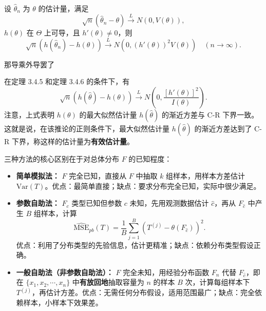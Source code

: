 \begin{theorem}[Delta 方法--也就是原来相当于y=x现在更普遍]
设 $\hat{\theta}_n$ 为 $\theta$ 的估计量，满足
$$
\sqrt{n}(\hat{\theta}_n - \theta) \xrightarrow{L} N(0, V(\theta)),
$$
$h(\theta)$ 在 $\Theta$ 上可导，且 $h'(\theta)\neq 0$，则
$$
\sqrt{n}(h(\hat{\theta}_n) - h(\theta)) \xrightarrow{L} N(0,(h'(\theta))^2 V(\theta)) \quad (n\to\infty).
$$
\end{theorem}
那导乘外导罢了
\begin{corollary}
在定理 3.4.5 和定理 3.4.6 的条件下，有
$$
\sqrt{n}(h(\hat{\theta}) - h(\theta)) \xrightarrow{L} N\!\left(0, \frac{[h'(\theta)]^2}{I(\theta)}\right).
$$
注意，上式表明 $h(\theta)$ 的最大似然估计量 $h(\hat{\theta})$ 的渐近方差与 C-R 下界一致。这就是说，在该推论的正则条件下，最大似然估计量 $h(\hat{\theta})$ 的渐近方差达到了 C-R 下界，称这样的估计量为\textbf{有效估计量}。
\end{corollary}
\begin{note}[模拟估计方法比较]
三种方法的核心区别在于对总体分布 $F$ 的已知程度：
\begin{itemize}
    \item \textbf{简单模拟法：} $F$ 完全已知，直接从 $F$ 中抽取 $k$ 组样本，用样本方差估计 $\mathrm{Var}(T)$。优点：最简单直接；缺点：要求分布完全已知，实际中很少满足。

    \item \textbf{参数自助法：} $F_c$ 类型已知但参数 $c$ 未知，先用观测数据估计 $\hat{c}$，再从 $F_{\hat{c}}$ 中产生 $B$ 组样本，计算
    $$
    \widehat{\mathrm{MSE}}_{pb}(T) = \frac{1}{B}\sum_{j=1}^B (T^{(j)} - \theta(F_{\hat{c}}))^2.
    $$
    优点：利用了分布类型的先验信息，估计更精准；缺点：依赖分布类型假设正确。

    \item \textbf{一般自助法（非参数自助法）：} $F$ 完全未知，用经验分布函数 $F_n$ 代替 $F_{\hat{c}}$，即在 $\{x_1,x_2,\cdots,x_n\}$ 中\textbf{有放回地}抽取容量为 $n$ 的样本 $B$ 次，计算每组样本下 $T^{(j)}$，再估计方差。优点：无需任何分布假设，适用范围最广；缺点：完全依赖样本，小样本下效果差。
\end{itemize}
\end{note}
